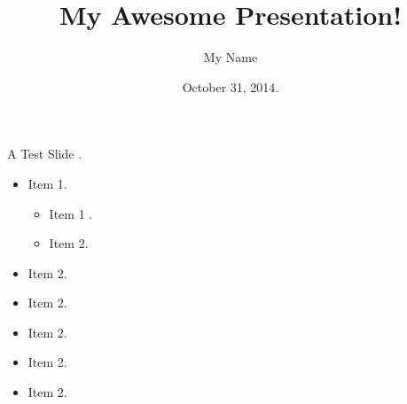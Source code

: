 \documentclass[table,11pt]{beamer}
\title{My Awesome Presentation!}
\author{My Name}
\institute{\small Reuse in Software Engineering Lab\\[.25\baselineskip]
\footnotesize Federal University of Bahia}
\date{October 31, 2014.}
\begin{document}
 
 
\begin{frame}[plain]    
  \titlepage   
\end{frame}        
     
\begin{frame}{A Test Slide .} 
  \begin{itemize}     
    \item Item 1.        
    \begin{itemize}     
    \item Item 1 .     
    \item Item 2.    
  \end{itemize}      
    \item Item 2. 
     \item Item 2. 
      \item Item 2.  
       \item Item 2. 
        \item Item 2.   
  \end{itemize} 
\end{frame}
 
\end{document}
